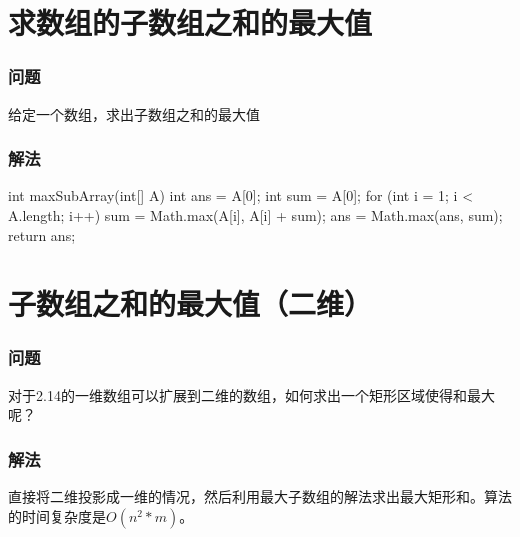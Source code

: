 \section{求数组的子数组之和的最大值} %
\label{sec:max-sum}

\subsubsection{问题}
给定一个数组，求出子数组之和的最大值

\subsubsection{解法}

\begin{Codex}[label={[$O(n)+O(1)$]Chap02_14_MaxSubarray.java}]
int maxSubArray(int[] A) {
    int ans = A[0];
    int sum = A[0];
    for (int i = 1; i < A.length; i++) {
        sum = Math.max(A[i], A[i] + sum);
        ans = Math.max(ans, sum);
    }
    return ans;
}
\end{Codex}

\section{子数组之和的最大值（二维）} %
\label{sec:max-sum-two-dimon}

\subsubsection{问题}
对于2.14的一维数组可以扩展到二维的数组，如何求出一个矩形区域使得和最大呢？

\subsubsection{解法}
直接将二维投影成一维的情况，然后利用最大子数组的解法求出最大矩形和。算法的时间复杂度是$O(n^2*m)$。

